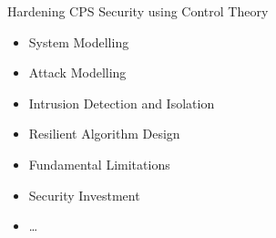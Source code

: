 \documentclass[10pt]{beamer}
\begin{document}

  


\begin{frame}{Hardening CPS Security using Control Theory}
  \begin{itemize}
  \item System Modelling
  \item Attack Modelling
  \item Intrusion Detection and Isolation
  \item Resilient Algorithm Design
  \item Fundamental Limitations
  \item Security Investment
  \item \dots
  \end{itemize}
\end{frame}
\end{document}

